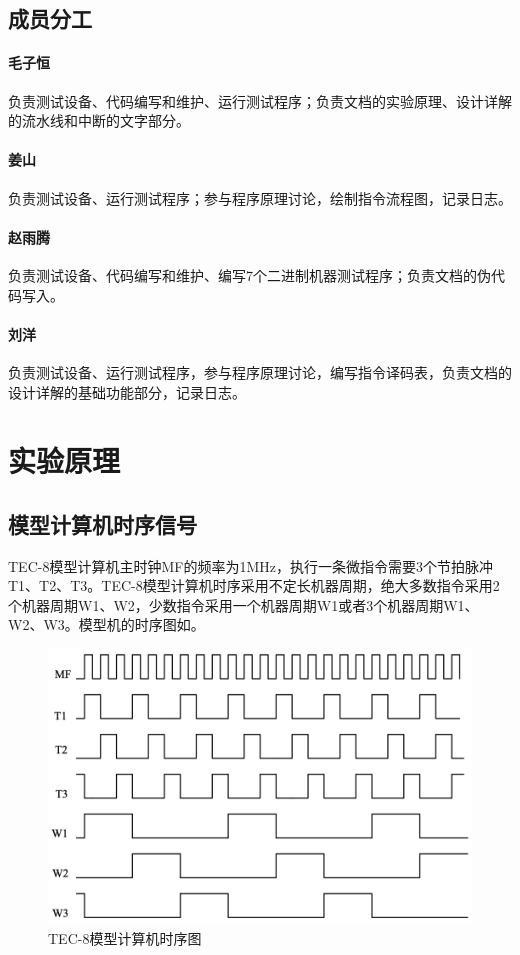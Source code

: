 \documentclass[lang=cn,11pt,a4paper,cite=authornum]{paper}
\begin{document}
\subsection{成员分工}


\paragraph{毛子恒} 负责测试设备、代码编写和维护、运行测试程序；负责文档的实验原理、设计详解的流水线和中断的文字部分。

\paragraph{姜山} 负责测试设备、运行测试程序；参与程序原理讨论，绘制指令流程图，记录日志。

\paragraph{赵雨腾}负责测试设备、代码编写和维护、编写7个二进制机器测试程序；负责文档的伪代码写入。

\paragraph{刘洋}负责测试设备、运行测试程序，参与程序原理讨论，编写指令译码表，负责文档的设计详解的基础功能部分，记录日志。


\section{实验原理}

\subsection{模型计算机时序信号}

TEC-8模型计算机主时钟MF的频率为1MHz，执行一条微指令需要3个节拍脉冲T1、T2、T3。TEC-8模型计算机时序采用不定长机器周期，绝大多数指令采用2个机器周期W1、W2，少数指令采用一个机器周期W1或者3个机器周期W1、W2、W3。模型机的时序图如。

\begin{figure}[htbp]
    \centering
    \includegraphics[width=0.7\linewidth]{./Images/clock.png}
    \caption{TEC-8模型计算机时序图\label{fig:clock}}
\end{figure}
\end{document}

